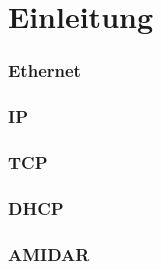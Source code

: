 \chapter{Einleitung}

\subsection{Ethernet}
\subsection{IP}
\subsection{TCP}
\subsection{DHCP}
\subsection{AMIDAR}
